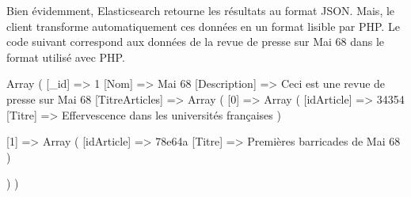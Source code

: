 \newpage
Bien évidemment, Elasticsearch retourne les résultats au format JSON. Mais, le client transforme automatiquement ces données en un format lisible par PHP. Le code suivant correspond aux données de la revue de presse sur Mai 68 dans le format utilisé avec PHP.

\begin{verbatimtab}[3]
Array
(
 [_id] => 1
 [Nom] => Mai 68
 [Description] => Ceci est une revue de presse sur Mai 68
 [TitreArticles] => Array
   (
		[0] => Array
		 (
			[idArticle] => 34354
			[Titre] => Effervescence dans les universités françaises
	   )

		[1] => Array
		 (
			[idArticle] => 78e64a
			[Titre] => Premières barricades de Mai 68
		 )

	)	
)
\end{verbatimtab}
